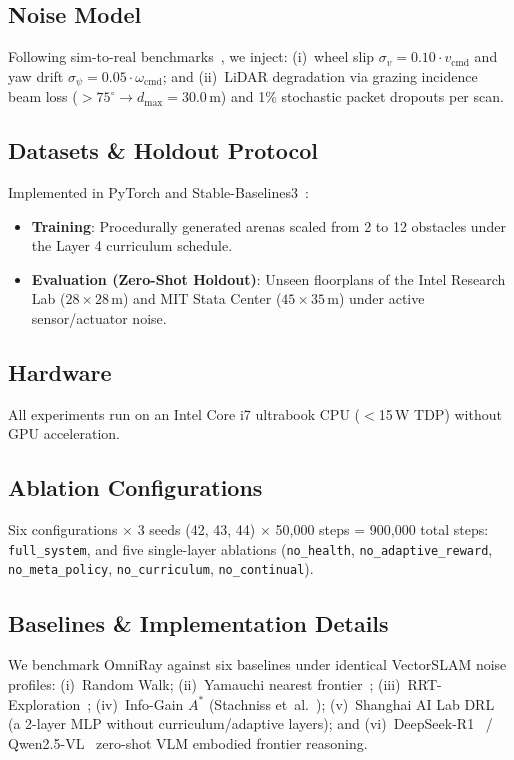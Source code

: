 \documentclass[conference]{IEEEtran}
\begin{document}
\subsection{Noise Model}
Following sim-to-real benchmarks~\cite{zhao2020}, we inject: (i)~wheel slip $\sigma_v = 0.10 \cdot v_{\text{cmd}}$ and yaw drift $\sigma_\psi = 0.05 \cdot \omega_{\text{cmd}}$; and (ii)~LiDAR degradation via grazing incidence beam loss ($>75^\circ \to d_{\max} = 30.0$\,m) and 1\% stochastic packet dropouts per scan.

\subsection{Datasets \& Holdout Protocol}
Implemented in PyTorch and Stable-Baselines3~\cite{raffin2021}:
\begin{itemize}
    \item \textbf{Training}: Procedurally generated arenas scaled from 2 to 12 obstacles under the Layer 4 curriculum schedule.
    \item \textbf{Evaluation (Zero-Shot Holdout)}: Unseen floorplans of the Intel Research Lab ($28\!\times\!28$\,m) and MIT Stata Center ($45\!\times\!35$\,m) under active sensor/actuator noise.
\end{itemize}

\subsection{Hardware}
All experiments run on an Intel Core i7 ultrabook CPU ($<$15\,W TDP) without GPU acceleration.

\subsection{Ablation Configurations}
Six configurations $\times$ 3 seeds (42, 43, 44) $\times$ 50{,}000 steps = 900{,}000 total steps: \texttt{full\_system}, and five single-layer ablations (\texttt{no\_health}, \texttt{no\_adaptive\_reward}, \texttt{no\_meta\_policy}, \texttt{no\_curriculum}, \texttt{no\_continual}).

\subsection{Baselines \& Implementation Details}
We benchmark OmniRay against six baselines under identical VectorSLAM noise profiles: (i)~Random Walk; (ii)~Yamauchi nearest frontier~\cite{yamauchi1997}; (iii)~RRT-Exploration~\cite{umari2017}; (iv)~Info-Gain $A^*$ (Stachniss et~al.~\cite{stachniss2005}); (v)~Shanghai AI Lab DRL~\cite{wang2024navformer} (a 2-layer MLP without curriculum/adaptive layers); and (vi)~DeepSeek-R1~\cite{deepseek2025} / Qwen2.5-VL~\cite{qwen2025vl} zero-shot VLM embodied frontier reasoning.
\end{document}
